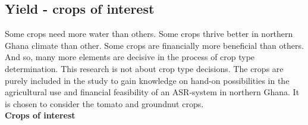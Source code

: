 %

\subsection{Yield - crops of interest}
\label{subsec:Yield_crop}
Some crops need more water than others. Some crops thrive better in northern Ghana climate than other. Some crops are financially more beneficial than others. And so, many more elements are decisive in the process of crop type determination. This research is not about crop type decisions. The crops are purely included in the study to gain knowledge on hand-on possibilities in the agricultural use and financial feasibility of an ASR-system in northern Ghana. It is chosen to consider the tomato and groundnut crops.\\

\textbf{Crops of interest}

